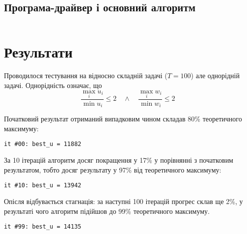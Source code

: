 \documentclass[a4paper, 12pt]{article}
\numberwithin{equation}{section}
\begin{document}
\inputminted{python}{../../code/knapsack/calculate_feroments.py}

\subsection{Програма-драйвер і основний алгоритм}

\inputminted{python}{../../code/knapsack/main.py}

\section{Результати}

Проводилося тестування на відносно складній задачі ($T = 100$) але однорідній задачі. Однорідність означає, що
\begin{equation}
    \frac{\max_i u_i}{\min u_i} \le 2 \quad \land \quad \frac{\max_i w_i}{\min w_i} \le 2
\end{equation}

Початковий результат отриманий випадковим чином складав 80\% теоретичного максимуму:
\begin{verbatim}
it #00: best_u = 11882
\end{verbatim}

За 10 ітерацій алгоритм досяг покращення у 17\% у порівнянні з початковим результатом, тобто досяг результату у 97\% від теоретичного максимуму:
\begin{verbatim}
it #10: best_u = 13942
\end{verbatim}

Опісля відбувається стагнація: за наступні 100 ітерацій прогрес склав ще 2\%, у результаті чого алгоритм підійшов до 99\% теоретичного максимуму.
\begin{verbatim}
it #99: best_u = 14135
\end{verbatim}
\end{document}
